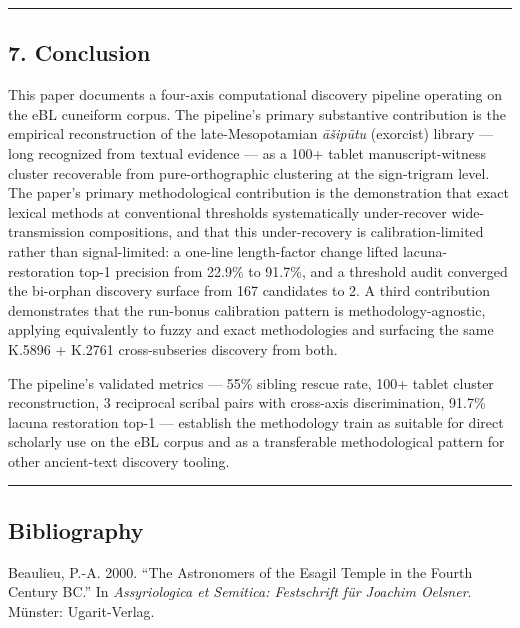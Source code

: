 \documentclass[
  11pt,
  letterpaper,
]{article}
\begin{document}
\begin{center}\rule{0.5\linewidth}{0.5pt}\end{center}

\subsection{7. Conclusion}\label{conclusion}

This paper documents a four-axis computational discovery pipeline
operating on the eBL cuneiform corpus. The pipeline's primary
substantive contribution is the empirical reconstruction of the
late-Mesopotamian \emph{āšipūtu} (exorcist) library --- long recognized
from textual evidence --- as a 100+ tablet manuscript-witness cluster
recoverable from pure-orthographic clustering at the sign-trigram level.
The paper's primary methodological contribution is the demonstration
that exact lexical methods at conventional thresholds systematically
under-recover wide-transmission compositions, and that this
under-recovery is calibration-limited rather than signal-limited: a
one-line length-factor change lifted lacuna-restoration top-1 precision
from 22.9\% to 91.7\%, and a threshold audit converged the bi-orphan
discovery surface from 167 candidates to 2. A third contribution
demonstrates that the run-bonus calibration pattern is
methodology-agnostic, applying equivalently to fuzzy and exact
methodologies and surfacing the same K.5896 + K.2761 cross-subseries
discovery from both.

The pipeline's validated metrics --- 55\% sibling rescue rate, 100+
tablet cluster reconstruction, 3 reciprocal scribal pairs with
cross-axis discrimination, 91.7\% lacuna restoration top-1 --- establish
the methodology train as suitable for direct scholarly use on the eBL
corpus and as a transferable methodological pattern for other
ancient-text discovery tooling.

\begin{center}\rule{0.5\linewidth}{0.5pt}\end{center}

\subsection{Bibliography}\label{bibliography}

Beaulieu, P.-A. 2000. ``The Astronomers of the Esagil Temple in the
Fourth Century BC.'' In \emph{Assyriologica et Semitica: Festschrift für
Joachim Oelsner}. Münster: Ugarit-Verlag.
\end{document}
